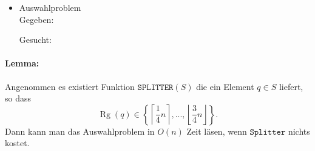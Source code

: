 \begin{itemize}
 \item Auswahlproblem\\
		Gegeben: 
		Gesucht:
\end{itemize}
\paragraph{Lemma:} Angenommen es  existiert Funktion $\mathtt{SPLITTER}(S)$ die ein Element $q \in S$ liefert, so dass \[\operatorname{Rg}(q) \in \left\{\left\lceil\frac{1}{4} n\right\rceil, ..., \left\lfloor\frac{3}{4}n\right\rfloor\right\}.\]
Dann kann man das Auswahlproblem in $O(n)$ Zeit läsen, wenn $\mathtt{Splitter}$ nichts kostet.


